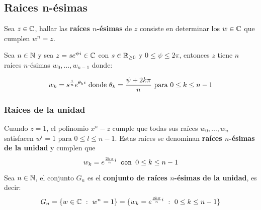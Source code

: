 \subsection{Raices n-ésimas}
Sea $z\in\mathbb{C}$, hallar las \textbf{ra\'ices $n$-ésimas} de $z$ consiste en determinar los $w\in\mathbb{C}$ que cumplen $w^n = z$.

Sea $n\in\mathbb{N}$ y sea $z=se^{\psi i}\in\mathbb{C}$ con $s\in\mathbb{R}_{\geq 0}$ y $0\leq\psi\leq 2\pi$, entonces $z$ tiene $n$ raíces $n$-ésimas $w_0,\dots,w_{n-1}$ donde:

$$w_k = s^{\frac{1}{n}}e^{\theta_k i} \text{  donde  } \theta_k = \frac{\psi + 2k\pi}{n} \text{ para } 0\leq k \leq n-1$$

\subsubsection{Raíces de la unidad}
Cuando $z=1$, el polinomio $x^n - z$ cumple que todas sus raíces $w_0,\dots,w_n$ satisfacen $w^l = 1$ para $0\leq l\leq n-1$. Estas raíces se denominan \textbf{raíces $n$-ésimas de la unidad} y cumplen que $$w_k = e^{\frac{2k\pi}{n} i} \texttt{ con } 0\leq k\leq n-1$$

Sea $n\in\mathbb{N}$, el conjunto $G_n$ es el \textbf{conjunto de raíces $n$-ésimas de la unidad}, es decir:
$$G_n =\{w\in\mathbb{C}~:~w^n = 1\} = \{w_k = e^{\frac{2k\pi}{n} i}  ~:~0\leq k\leq n-1\}$$

